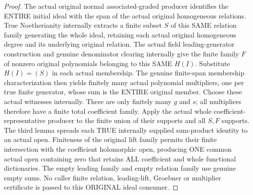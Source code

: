 \begin{proof}
The actual original normal associated-graded producer identifies the
ENTIRE initial ideal with the span of the actual original homogeneous
relations. True Noetherianity internally extracts a finite subset $S$
of this SAME relation family generating the whole ideal, retaining each
actual original homogeneous degree and its underlying original relation.
The actual field leading-generator construction and genuine denominator
clearing internally give the finite family $F$ of nonzero original
polynomials belonging to this SAME $H(I)$. Substitute $H(I)=(S)$ in each
actual membership. The genuine finite-span membership characterization
then yields finitely many actual polynomial multipliers, one per true
finite generator, whose sum is the ENTIRE original member. Choose these
actual witnesses internally. There are only finitely many $g$ and $s$;
all multipliers therefore have a finite total coefficient family. Apply
the actual whole coefficient-representative producer to the finite union
of their supports and all $S,F$ supports. The third lemma spreads each
TRUE internally supplied sum-product identity to an actual open. Finiteness
of the original lift family permits their finite intersection with the
coefficient holomorphic open, producing ONE common actual open containing
zero that retains ALL coefficient and whole functional dictionaries. The
empty leading family and empty relation family use genuine empty sums.
No caller finite relation, leading-lift, Groebner or multiplier certificate
is passed to this ORIGINAL ideal consumer.
\end{proof}

